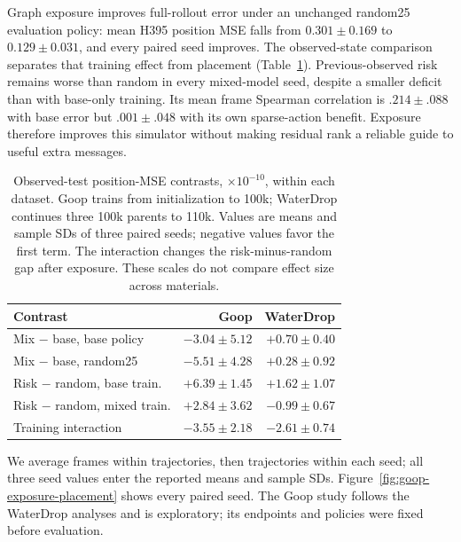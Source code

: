 Graph exposure improves full-rollout error under an unchanged random25 evaluation policy: mean H395 position MSE falls from $0.301\pm0.169$ to $0.129\pm0.031$, and every paired seed improves. The observed-state comparison separates that training effect from placement (Table~\ref{tab:goop-exposure-placement}). Previous-observed risk remains worse than random in every mixed-model seed, despite a smaller deficit than with base-only training. Its mean frame Spearman correlation is $.214\pm.088$ with base error but $.001\pm.048$ with its own sparse-action benefit. Exposure therefore improves this simulator without making residual rank a reliable guide to useful extra messages.

\begin{table}[t]
\centering\small
\caption{Observed-test position-MSE contrasts, $\times10^{-10}$, within each dataset. Goop trains from initialization to 100k; WaterDrop continues three 100k parents to 110k. Values are means and sample SDs of three paired seeds; negative values favor the first term. The interaction changes the risk-minus-random gap after exposure. These scales do not compare effect size across materials.}
\label{tab:goop-exposure-placement}
\setlength{\tabcolsep}{3pt}
\begin{tabular}{lrr}
\toprule
Contrast & Goop & WaterDrop\\
\midrule
Mix $-$ base, base policy & $-3.04\pm5.12$ & $+0.70\pm0.40$\\
Mix $-$ base, random25 & $-5.51\pm4.28$ & $+0.28\pm0.92$\\
Risk $-$ random, base train. & $+6.39\pm1.45$ & $+1.62\pm1.07$\\
Risk $-$ random, mixed train. & $+2.84\pm3.62$ & $-0.99\pm0.67$\\
Training interaction & $-3.55\pm2.18$ & $-2.61\pm0.74$\\
\bottomrule
\end{tabular}
\end{table}

We average frames within trajectories, then trajectories within each seed; all three seed values enter the reported means and sample SDs. Figure~\ref{fig:goop-exposure-placement} shows every paired seed. The Goop study follows the WaterDrop analyses and is exploratory; its endpoints and policies were fixed before evaluation.

